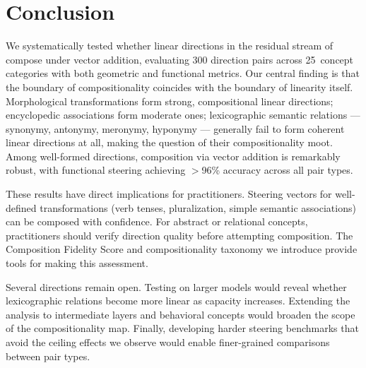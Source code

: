 \section{Conclusion}
\label{sec:conclusion}

We systematically tested whether linear directions in the residual stream of \pythia compose under vector addition, evaluating 300 direction pairs across 25~concept categories with both geometric and functional metrics.
Our central finding is that the boundary of compositionality coincides with the boundary of linearity itself.
Morphological transformations form strong, compositional linear directions; encyclopedic associations form moderate ones; lexicographic semantic relations --- synonymy, antonymy, meronymy, hyponymy --- generally fail to form coherent linear directions at all, making the question of their compositionality moot.
Among well-formed directions, composition via vector addition is remarkably robust, with functional steering achieving $>$96\% accuracy across all pair types.

These results have direct implications for practitioners.
Steering vectors for well-defined transformations (verb tenses, pluralization, simple semantic associations) can be composed with confidence.
For abstract or relational concepts, practitioners should verify direction quality before attempting composition.
The Composition Fidelity Score and compositionality taxonomy we introduce provide tools for making this assessment.

Several directions remain open.
Testing on larger models would reveal whether lexicographic relations become more linear as capacity increases.
Extending the analysis to intermediate layers and behavioral concepts would broaden the scope of the compositionality map.
Finally, developing harder steering benchmarks that avoid the ceiling effects we observe would enable finer-grained comparisons between pair types.

